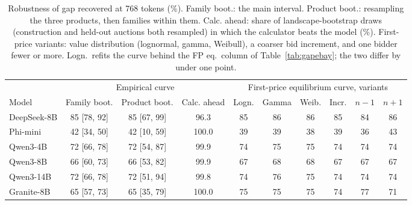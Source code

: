 \begin{table}[t]
\caption{Robustness of gap recovered at 768 tokens (\%). Family boot.: the main interval. Product boot.: resampling the three products, then families within them. Calc. ahead: share of landscape-bootstrap draws (construction and held-out auctions both resampled) in which the calculator beats the model (\%). First-price variants: value distribution (lognormal, gamma, Weibull), a coarser bid increment, and one bidder fewer or more. Logn.\ refits the curve behind the FP eq.\ column of Table~\ref{tab:gapebay}; the two differ by under one point.}
\label{tab:robust}
\footnotesize
\centering

\begin{tabular}{lccc cccccc}
\toprule
& \multicolumn{3}{c}{Empirical curve} & \multicolumn{6}{c}{First-price equilibrium curve, variants} \\ \cmidrule(lr){2-4}\cmidrule(lr){5-10} Model & Family boot. & Product boot. & Calc. ahead & Logn. & Gamma & Weib. & Incr. & $n-1$ & $n+1$ \\
\midrule
DeepSeek-8B & 85 [78, 92] & 85 [67, 99] & 96.3 & 85 & 86 & 86 & 85 & 84 & 86 \\
Phi-mini & 42 [34, 50] & 42 [10, 59] & 100.0 & 39 & 39 & 38 & 39 & 36 & 43 \\
Qwen3-4B & 72 [66, 78] & 72 [54, 87] & 99.9 & 74 & 75 & 75 & 74 & 74 & 74 \\
Qwen3-8B & 66 [60, 73] & 66 [53, 82] & 99.9 & 67 & 68 & 68 & 67 & 67 & 67 \\
Qwen3-14B & 72 [66, 78] & 72 [51, 94] & 99.8 & 74 & 76 & 75 & 74 & 74 & 74 \\
Granite-8B & 65 [57, 73] & 65 [35, 79] & 100.0 & 75 & 75 & 75 & 74 & 77 & 71 \\
\bottomrule
\end{tabular}
\end{table}
